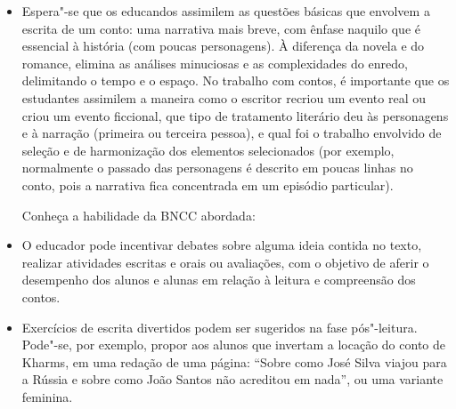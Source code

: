 \documentclass[11pt]{extarticle}
\begin{document}
\begin{itemize}
\item Espera"-se que os educandos assimilem as questões básicas que envolvem
a escrita de um conto: uma narrativa mais breve, com ênfase naquilo que
é essencial à história (com poucas personagens). À diferença da novela e
do romance, elimina as análises minuciosas e as complexidades do enredo,
delimitando o tempo e o espaço. No trabalho com contos, é importante que
os estudantes assimilem a maneira como o escritor recriou um evento real
ou criou um evento ficcional, que tipo de tratamento literário deu às
personagens e à narração (primeira ou terceira pessoa), e qual foi o
trabalho envolvido de seleção e de harmonização dos elementos
selecionados (por exemplo, normalmente o passado das personagens é
descrito em poucas linhas no conto, pois a narrativa fica concentrada em
um episódio particular).

Conheça a habilidade da BNCC abordada:

\item O educador pode incentivar debates sobre alguma ideia contida no
texto, realizar atividades escritas e orais ou avaliações, com o
objetivo de aferir o desempenho dos alunos e alunas em relação à leitura
e compreensão dos contos.

\item Exercícios de escrita divertidos podem ser sugeridos na fase
pós"-leitura. Pode"-se, por exemplo, propor aos alunos que invertam a
locação do conto de Kharms, em uma redação de uma página: ``Sobre como
José Silva viajou para a Rússia e sobre como João Santos não acreditou
em nada'', ou uma variante feminina.



\end{itemize}
\end{document}
